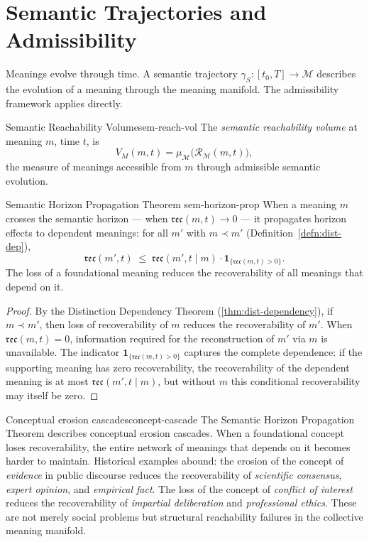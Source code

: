 \documentclass[12pt,twoside,openright]{book}
\newcommand{\reach}{\mathcal{R}}
\newcommand{\reco}{\mathfrak{rec}}
\begin{document}
\section{Semantic Trajectories and Admissibility}

Meanings evolve through time. A semantic trajectory
$\gamma_S : [t_0, T] \to \mathcal{M}$ describes the
evolution of a meaning through the meaning manifold.
The admissibility framework applies directly.

\begin{definition}{Semantic Reachability Volume}{sem-reach-vol}
  The \emph{semantic reachability volume} at meaning $m$,
  time $t$, is
  \[
    V_M(m, t)
    = \mu_\mathcal{M}\!\bigl(\reach_\mathcal{M}(m, t)\bigr),
  \]
  the measure of meanings accessible from $m$ through
  admissible semantic evolution.
\end{definition}

\begin{theorem}{Semantic Horizon Propagation Theorem}%
  {sem-horizon-prop}
  When a meaning $m$ crosses the semantic horizon —
  when $\reco(m, t) \to 0$ — it propagates horizon
  effects to dependent meanings:
  for all $m'$ with $m \prec m'$
  (Definition~\ref{defn:dist-dep}),
  \[
    \reco(m', t)
    \;\le\;
    \reco(m', t \mid m)
    \cdot \mathbf{1}_{\{\reco(m,t)>0\}}.
  \]
  The loss of a foundational meaning reduces the
  recoverability of all meanings that depend on it.
\end{theorem}

\begin{proof}
  By the Distinction Dependency Theorem
  (\cref{thm:dist-dependency}), if $m \prec m'$,
  then loss of recoverability of $m$ reduces the
  recoverability of $m'$.
  When $\reco(m, t) = 0$, information required for
  the reconstruction of $m'$ via $m$ is unavailable.
  The indicator $\mathbf{1}_{\{\reco(m,t)>0\}}$
  captures the complete dependence: if the supporting
  meaning has zero recoverability, the recoverability
  of the dependent meaning is at most
  $\reco(m', t \mid m)$, but without $m$ this
  conditional recoverability may itself be zero.
\end{proof}

\begin{remark}{Conceptual erosion cascades}{concept-cascade}
  The Semantic Horizon Propagation Theorem describes
  conceptual erosion cascades.
  When a foundational concept loses recoverability,
  the entire network of meanings that depends on it
  becomes harder to maintain.
  Historical examples abound:
  the erosion of the concept of \emph{evidence}
  in public discourse reduces the recoverability of
  \emph{scientific consensus}, \emph{expert opinion},
  and \emph{empirical fact}.
  The loss of the concept of \emph{conflict of interest}
  reduces the recoverability of \emph{impartial
  deliberation} and \emph{professional ethics}.
  These are not merely social problems but structural
  reachability failures in the collective meaning manifold.
\end{remark}
\end{document}
